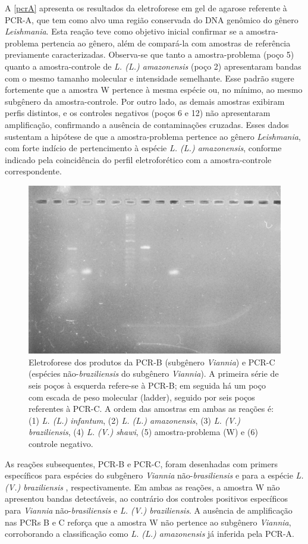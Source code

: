 A \cref{pcrA} apresenta os resultados da eletroforese em gel de agarose referente à PCR-A, que tem como alvo uma região conservada do DNA genômico do gênero
 \textit{Leishmania}. Esta reação teve como objetivo inicial confirmar se a amostra-problema pertencia ao gênero, além de compará-la com amostras de referência previamente 
 caracterizadas. Observa-se que tanto a amostra-problema (poço 5) quanto a amostra-controle de \textit{L. (L.) amazonensis} (poço 2) apresentaram bandas com o mesmo tamanho 
 molecular e intensidade semelhante. Esse padrão sugere fortemente que a amostra W pertence à mesma espécie ou, no mínimo, ao mesmo subgênero da amostra-controle. Por outro 
 lado, as demais amostras  exibiram perfis distintos, e os controles negativos (poços 6 e 12) não apresentaram amplificação, confirmando a ausência de contaminações cruzadas.
Esses dados sustentam a hipótese de que a amostra-problema pertence ao gênero \textit{Leishmania}, com forte indício de pertencimento à espécie \textit{L. (L.) amazonensis}, 
conforme indicado pela coincidência do perfil eletroforético com a amostra-controle correspondente.

\begin{figure}
 \centering
 \includegraphics[width=.4\textwidth]{fig/pcrBeC_g8.jpg}
 \caption{Eletroforese dos produtos da PCR-B (subgênero \textit{Viannia}) e PCR-C (espécies não-\textit{braziliensis} do subgênero \textit{Viannia}). 
 A primeira série de seis poços à esquerda refere-se à PCR-B; em seguida há um poço com escada de peso molecular (ladder), seguido por seis poços referentes 
 à PCR-C. A ordem das amostras em ambas as reações é: (1) \textit{L. (L.) infantum}, (2) \textit{L. (L.) amazonensis}, (3) \textit{L. (V.) braziliensis}, 
 (4) \textit{L. (V.) shawi}, (5) amostra-problema (W) e (6) controle negativo.}
 \label{pcrBC}
 \end{figure}

As reações subsequentes, PCR-B e PCR-C, foram desenhadas com primers específicos
para espécies do subgênero \textit{Viannia} não-\textit{brasiliensis} e
para a espécie \textit{L. (V.) braziliensis
}, respectivamente. Em ambas as reações, a amostra W não apresentou
bandas detectáveis, ao contrário dos controles positivos específicos para 
\textit{Viannia} não-\textit{brasiliensis} e \textit{L. (V.) braziliensis}. A ausência de
amplificação nas PCRs B e C reforça que a amostra W não pertence ao subgênero
\textit{Viannia}, corroborando a classificação como \textit{L.
(L.) amazonensis} já inferida pela PCR-A.

